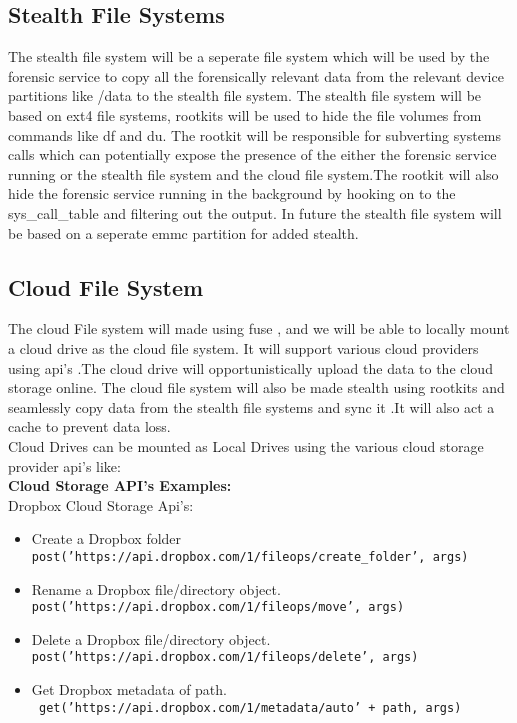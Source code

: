  \subsection{Stealth File Systems}
  The stealth file system will be a seperate file system which will be used by the forensic service to copy all the forensically relevant data from the relevant device partitions like /data to the stealth file system. The stealth file system will be based on ext4 file systems, rootkits will be used to hide the file volumes from commands like df and du. The rootkit will be responsible for subverting systems calls which can potentially expose the presence of the either the forensic service running or the stealth file system and the cloud file system.The rootkit will also hide the forensic service running in the background by hooking on to the sys\_call\_table and filtering out the output. In future the stealth file system will be based on a seperate emmc partition for added stealth.
  \subsection{Cloud File System}
  The cloud File system will made using fuse , and we will be able to locally mount a cloud drive as the cloud file system. It will support various cloud providers using api's .The cloud drive will opportunistically upload the data to the cloud storage online. The cloud file system will also be made stealth using rootkits and seamlessly copy data from the stealth file systems and sync it .It will also act a cache to prevent data loss.\\
  
  Cloud Drives can be mounted as Local Drives using the various cloud storage provider api's like:\\
  \textbf{Cloud Storage API's Examples:}\\
  Dropbox Cloud Storage Api's:\\
  \begin{itemize}
  \item Create a Dropbox folder \\
  \tt post('https://api.dropbox.com/1/fileops/create\_folder', args)\\
  \item Rename a Dropbox file/directory object.\\
    \tt  post('https://api.dropbox.com/1/fileops/move', args)\\
    
   \item Delete a Dropbox file/directory object.\\
    \tt post('https://api.dropbox.com/1/fileops/delete', args)\\
    
    \item Get Dropbox metadata of path.\\
    \tt
    get('https://api.dropbox.com/1/metadata/auto' + path, args)\\
  
  \end{itemize} 
 	
